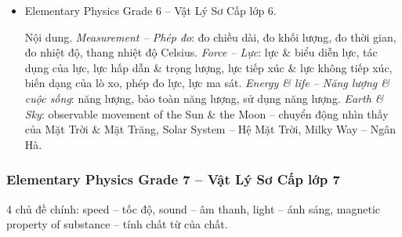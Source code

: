 \documentclass[12pt,twoside]{book}
\begin{document}
\begin{itemize}
	\item Elementary Physics Grade 6 -- Vật Lý Sơ Cấp lớp 6.
	
	{\sf Nội dung.} {\it Measurement -- Phép đo}: đo chiều dài, đo khối lượng, đo thời gian, đo nhiệt độ, thang nhiệt độ Celsius. {\it Force -- Lực}: lực \& biểu diễn lực, tác dụng của lực, lực hấp dẫn \& trọng lượng, lực tiếp xúc \& lực không tiếp xúc, biến dạng của lò xo, phép đo lực, lực ma sát. {\it Energy \& life -- Năng lượng \& cuộc sống}: năng lượng, bảo toàn năng lượng, sử dụng năng lượng. {\it Earth \& Sky}: observable movement of the Sun \& the Moon -- chuyển động nhìn thấy của Mặt Trời \& Mặt Trăng, Solar System -- Hệ Mặt Trời, Milky Way -- Ngân Hà.
\end{itemize}

\subsubsection{Elementary Physics Grade 7 -- Vật Lý Sơ Cấp lớp 7}
4 chủ đề chính: speed -- tốc độ, sound -- âm thanh, light -- ánh sáng, magnetic property of substance -- tính chất từ của chất.
\end{document}
